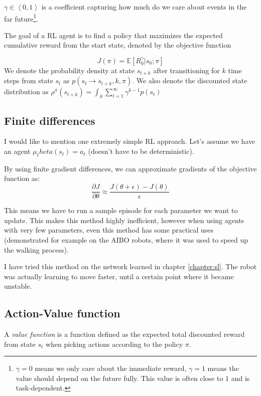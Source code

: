 $\gamma \in \left\langle 0,1\right\rangle$ is a coefficient capturing how much do we care about events in the far future\footnote{$\gamma=0$ means we only care about the immediate reward, $\gamma=1$ means the value should depend on the future fully. This value is often close to $1$ and is task-dependent.}.

The goal of a RL agent is to find a policy that maximizes the expected cumulative reward from the start state, denoted by the objective function

\begin{equation}
J(\pi)=\mathbb{E}[R_0^\gamma|s_0;\pi]
\end{equation}
We denote the probability density at state $s_{t+k}$ after transitioning for $k$ time steps from state $s_t$ as $p(s_t\to s_{t+k},k,\pi)$. We also denote the discounted state distribution as $\rho^\pi(s_{t+k})=\int_S\sum_{t=1}^\infty \gamma^{k-1}p(s_{t})$


\subsection{Finite differences}
I would like to mention one extremely simple RL approach. Let's assume we have an agent $\mu_theta(s_t)=a_t$ (doesn't have to be deterministic).

By using finite gradient differences, we can approximate gradients of the objective function as:
\begin{equation}
\dfrac{\partial J}{\partial \theta} \approx \dfrac{J(\theta + \epsilon)-J(\theta)}{\epsilon}
\end{equation}

This means we have to run a sample episode for each parameter we want to update. This makes this method highly inefficient, however when using agents with very few parameters, even this method has some practical uses (demonstrated for example on the AIBO robots, where it was used to speed up the walking process).

I have tried this method on the network learned in chapter \ref{chapter:sl}. The robot was actually learning to move faster, until a certain point where it became unstable.

\subsection{Action-Value function}
A \textit{value function} is a function defined as the expected total discounted reward from state $s_t$ when picking actions according to the policy $\pi$.


